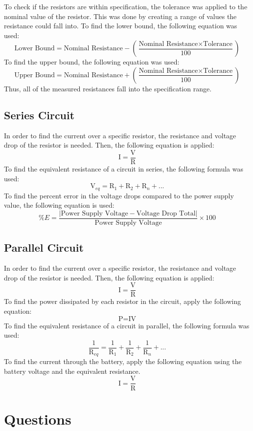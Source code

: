 \documentclass[titlepage]{article}
\begin{document}
To check if the resistors are within specification, the tolerance was applied to the nominal value of the resistor. This was done by creating a range of values the resistance could fall into. To find the lower bound, the following equation was used:
\[\text{Lower Bound} = \text{Nominal Resistance} - \left(\frac{\text{Nominal Resistance} \times \text{Tolerance}}{100}\right)\] 
To find the upper bound, the following equation was used:
\[\text{Upper Bound} = \text{Nominal Resistance} + \left(\frac{\text{Nominal Resistance} \times \text{Tolerance}}{100}\right)\] 
Thus, all of the measured resistances fall into the specification range.

        \subsection{Series Circuit} 
	In order to find the current over a specific resistor, the resistance and voltage drop of the resistor is needed. Then, the following equation is applied:
\[ \text{I} = \frac{\text{V}}{\text{R}} \]
To find the equivalent resistance of a circuit in series, the following formula was used:
\[\text{V}_{eq} = \text{R}_{1} + \text{R}_2 + \text{R}_n + ... \]
To find the percent error in the voltage drops compared to the power supply value, the following equation is used:
\[\%E = \frac{|\text{Power Supply Voltage} - \text{Voltage Drop Total}|}{\text{Power Supply Voltage}} \times 100\]

	\subsection{Parallel Circuit}
	In order to find the current over a specific resistor, the resistance and voltage drop of the resistor is needed. Then, the following equation is applied:
\[ \text{I} = \frac{\text{V}}{\text{R}} \]
	To find the power dissipated by each resistor in the circuit, apply the following equation:
	\[ \text{P} = \text{IV}\]
	To find the equivalent resistance of a circuit in parallel, the following formula was used:
	\[\frac{1}{\text{R}_{eq}} = \frac{1}{\text{R}_1} + \frac{1}{\text{R}_2} + \frac{1}{\text{R}_n} + ... \]
	To find the current through the battery, apply the following equation using the battery voltage and the equivalent resistance.
\[ \text{I} = \frac{\text{V}}{\text{R}} \]


\section{Questions}
\end{document}
